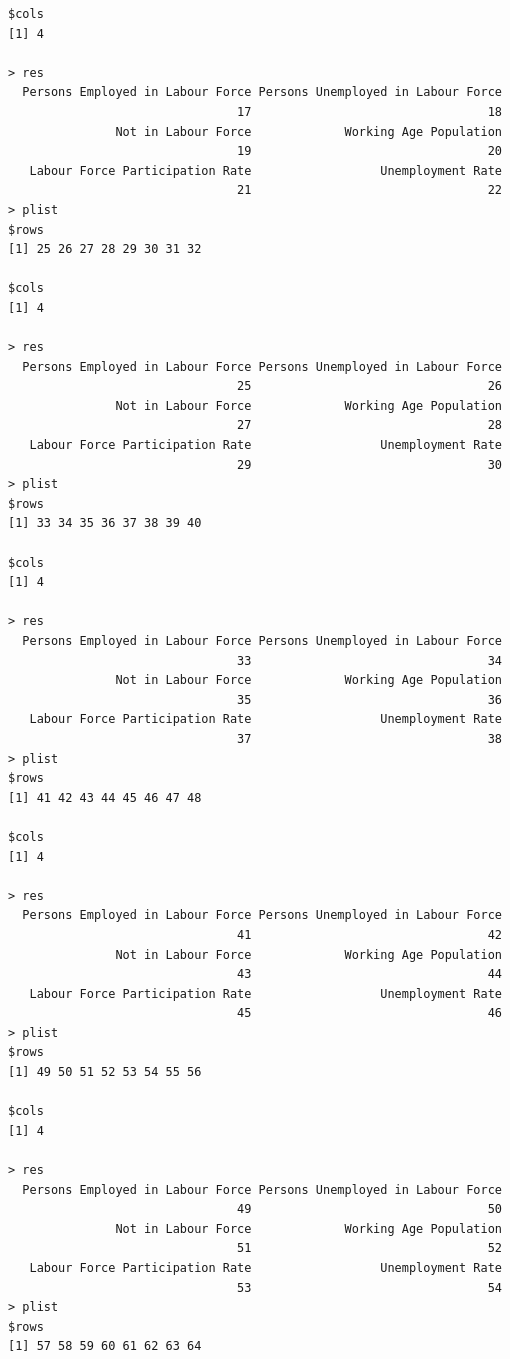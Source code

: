 \documentclass[a4paper]{article}
\begin{document}
\begin{verbatim}
$cols
[1] 4

> res 
  Persons Employed in Labour Force Persons Unemployed in Labour Force 
                                17                                 18 
               Not in Labour Force             Working Age Population 
                                19                                 20 
   Labour Force Participation Rate                  Unemployment Rate 
                                21                                 22 
> plist 
$rows
[1] 25 26 27 28 29 30 31 32

$cols
[1] 4

> res 
  Persons Employed in Labour Force Persons Unemployed in Labour Force 
                                25                                 26 
               Not in Labour Force             Working Age Population 
                                27                                 28 
   Labour Force Participation Rate                  Unemployment Rate 
                                29                                 30 
> plist 
$rows
[1] 33 34 35 36 37 38 39 40

$cols
[1] 4

> res 
  Persons Employed in Labour Force Persons Unemployed in Labour Force 
                                33                                 34 
               Not in Labour Force             Working Age Population 
                                35                                 36 
   Labour Force Participation Rate                  Unemployment Rate 
                                37                                 38 
> plist 
$rows
[1] 41 42 43 44 45 46 47 48

$cols
[1] 4

> res 
  Persons Employed in Labour Force Persons Unemployed in Labour Force 
                                41                                 42 
               Not in Labour Force             Working Age Population 
                                43                                 44 
   Labour Force Participation Rate                  Unemployment Rate 
                                45                                 46 
> plist 
$rows
[1] 49 50 51 52 53 54 55 56

$cols
[1] 4

> res 
  Persons Employed in Labour Force Persons Unemployed in Labour Force 
                                49                                 50 
               Not in Labour Force             Working Age Population 
                                51                                 52 
   Labour Force Participation Rate                  Unemployment Rate 
                                53                                 54 
> plist 
$rows
[1] 57 58 59 60 61 62 63 64


\end{verbatim}
\end{document}
